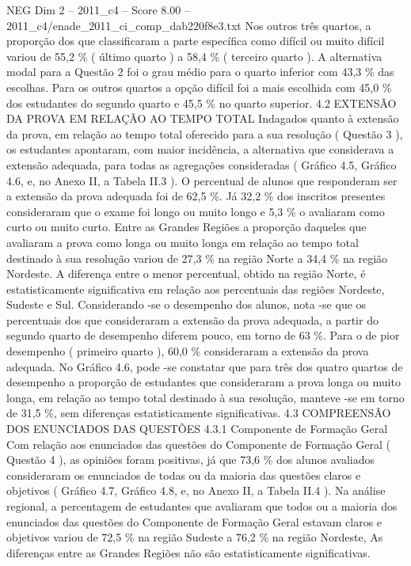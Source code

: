\begin{textsample}{NEG Dim 2 – 2011\_c4 – Score 8.00 – 2011\_c4/enade\_2011\_ci\_comp\_dab220f8e3.txt}
Nos outros três quartos, a proporção dos que classificaram a parte específica como difícil ou muito difícil variou de 55,2 \% ( último quarto ) a 58,4 \% ( terceiro quarto ).
A alternativa modal para a Questão 2 foi o grau médio para o quarto inferior com 43,3 \% das escolhas.
Para os outros quartos a opção difícil foi a mais escolhida com 45,0 \% dos estudantes do segundo quarto e 45,5 \% no quarto superior. 4.2 EXTENSÃO DA PROVA EM RELAÇÃO AO TEMPO TOTAL Indagados quanto à extensão da prova, em relação ao tempo total oferecido para a sua resolução ( Questão 3 ), os estudantes apontaram, com maior incidência, a alternativa que considerava a extensão adequada, para todas as agregações consideradas ( Gráfico 4.5, Gráfico 4.6, e, no Anexo II, a Tabela II.3 ).
O percentual de alunos que responderam ser a extensão da prova adequada foi de 62,5 \%.
Já 32,2 \% dos inscritos presentes consideraram que o exame foi longo ou muito longo e 5,3 \% o avaliaram como curto ou muito curto.
Entre as Grandes Regiões a proporção daqueles que avaliaram a prova como longa ou muito longa em relação ao tempo total destinado à sua resolução variou de 27,3 \% na região Norte a 34,4 \% na região Nordeste.
A diferença entre o menor percentual, obtido na região Norte, é estatisticamente significativa em relação aos percentuais das regiões Nordeste, Sudeste e Sul.
Considerando -se o desempenho dos alunos, nota -se que os percentuais dos que consideraram a extensão da prova adequada, a partir do segundo quarto de desempenho diferem pouco, em torno de 63 \%.
Para o de pior desempenho ( primeiro quarto ), 60,0 \% consideraram a extensão da prova adequada.
No Gráfico 4.6, pode -se constatar que para três dos quatro quartos de desempenho a proporção de estudantes que consideraram a prova longa ou muito longa, em relação ao tempo total destinado à sua resolução, manteve -se em torno de 31,5 \%, sem diferenças estatisticamente significativas. 4.3 COMPREENSÃO DOS ENUNCIADOS DAS QUESTÕES 4.3.1 Componente de Formação Geral Com relação aos enunciados das questões do Componente de Formação Geral ( Questão 4 ), as opiniões foram positivas, já que 73,6 \% dos alunos avaliados consideraram os enunciados de todas ou da maioria das questões claros e objetivos ( Gráfico 4.7, Gráfico 4.8, e, no Anexo II, a Tabela II.4 ).
Na análise regional, a percentagem de estudantes que avaliaram que todos ou a maioria dos enunciados das questões do Componente de Formação Geral estavam claros e objetivos variou de 72,5 \% na região Sudeste a 76,2 \% na região Nordeste, As diferenças entre as Grandes Regiões não são estatisticamente significativas.

\end{textsample}
